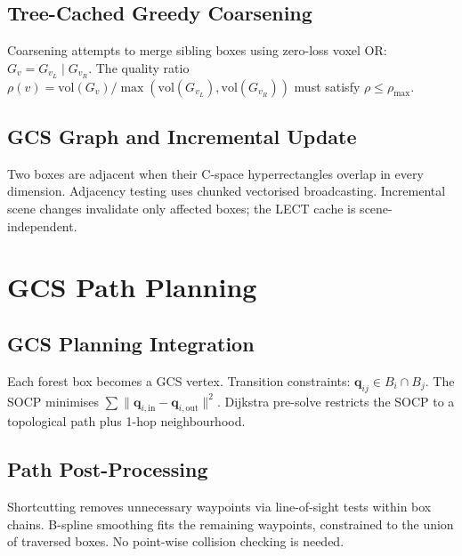 \documentclass[journal]{IEEEtran}
\begin{document}
\subsection{Tree-Cached Greedy Coarsening}\label{sec:coarsen}

Coarsening attempts to merge sibling boxes using zero-loss voxel OR:
$G_{v} = G_{v_L} \mathbin{|} G_{v_R}$.
The quality ratio
$\rho(v) = \mathrm{vol}(G_v) / \max(\mathrm{vol}(G_{v_L}), \mathrm{vol}(G_{v_R}))$
must satisfy $\rho \leq \rho_\text{max}$.

\subsection{GCS Graph and Incremental Update}\label{sec:gcs_graph}

Two boxes are adjacent when their C-space hyperrectangles overlap
in every dimension.
Adjacency testing uses chunked vectorised broadcasting.
Incremental scene changes invalidate only affected boxes;
the LECT cache is scene-independent.

\section{GCS Path Planning}\label{sec:planner}

\subsection{GCS Planning Integration}\label{sec:gcs_planning}

Each forest box becomes a GCS vertex.
Transition constraints: $\bm{q}_{ij} \in B_i \cap B_j$.
The SOCP minimises $\sum \|\bm{q}_{i,\text{in}} - \bm{q}_{i,\text{out}}\|^2$.
Dijkstra pre-solve restricts the SOCP to a topological path
plus 1-hop neighbourhood.

\subsection{Path Post-Processing}\label{sec:post_process}

Shortcutting removes unnecessary waypoints via line-of-sight tests
within box chains.
B-spline smoothing fits the remaining waypoints,
constrained to the union of traversed boxes.
No point-wise collision checking is needed.

\end{document}
